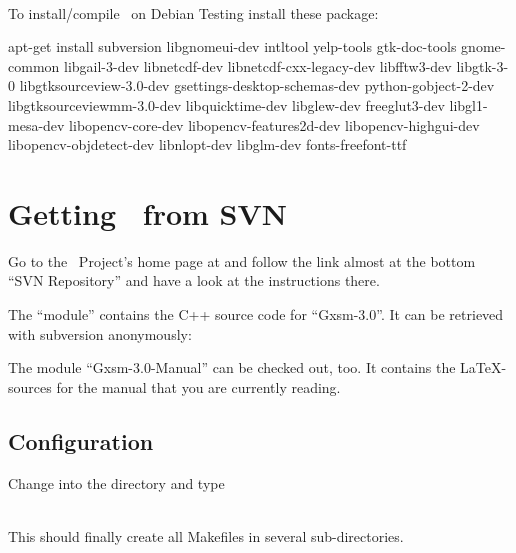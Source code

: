 
\ \\

To install/compile \Gxsm\ on Debian Testing install these package:

\begin{verbatim*}
apt-get install subversion libgnomeui-dev intltool yelp-tools
 gtk-doc-tools gnome-common libgail-3-dev libnetcdf-dev
 libnetcdf-cxx-legacy-dev libfftw3-dev libgtk-3-0
 libgtksourceview-3.0-dev gsettings-desktop-schemas-dev
 python-gobject-2-dev libgtksourceviewmm-3.0-dev
 libquicktime-dev libglew-dev freeglut3-dev libgl1-mesa-dev
 libopencv-core-dev libopencv-features2d-dev libopencv-highgui-dev
 libopencv-objdetect-dev libnlopt-dev libglm-dev fonts-freefont-ttf
\end{verbatim*}




\section{Getting \Gxsm\ from SVN}

Go to the \Gxsm\ Project's home page at
 and follow the link almost at the
bottom ``SVN Repository'' and have a look at the instructions there. 

The ``module'' contains the C++ source code for ``Gxsm-3.0''. It can be retrieved with subversion
anonymously:




The module ``Gxsm-3.0-Manual'' can be checked out, too. It contains the
\LaTeX-sources for the manual that you are currently reading.




\subsection{Configuration}

Change into the  directory and type

\\[1mm]
This should finally create all Makefiles in several sub-directories.

